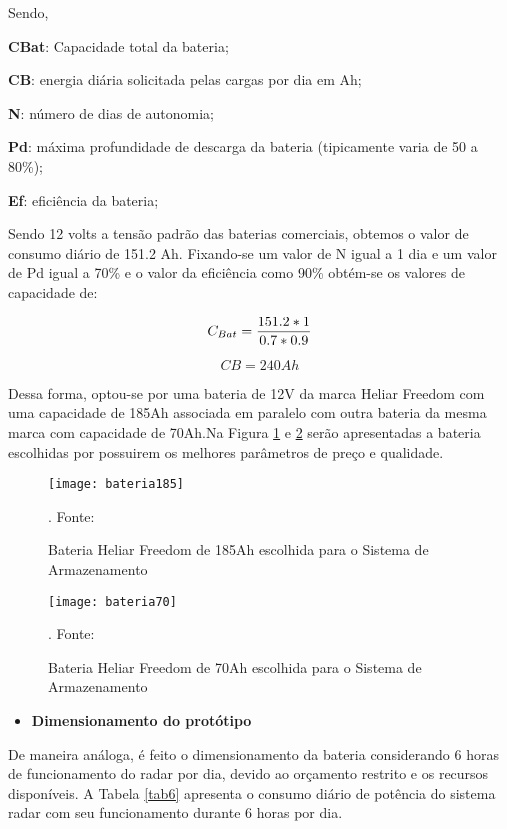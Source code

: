 Sendo,

\textbf{CBat}: Capacidade total da bateria;

\textbf{CB}: energia diária solicitada pelas cargas por dia em Ah;

\textbf{N}: número de dias de autonomia;

\textbf{Pd}: máxima profundidade de descarga da bateria (tipicamente varia de 50 a 80\%);

\textbf{Ef}: eficiência da bateria;

Sendo 12 volts a tensão padrão das baterias comerciais, obtemos o valor de consumo diário de 151.2 Ah. Fixando-se um valor de N igual a 1 dia e um valor de Pd igual a 70\% e o valor da eficiência como 90\% obtém-se os valores de capacidade de:

\begin{equation}
    C_{Bat} = \frac{151.2*1}{0.7*0.9}\\
\end{equation}

\begin{equation}
    CB = 240 Ah
\end{equation}



Dessa forma, optou-se por uma bateria de 12V da marca Heliar Freedom com uma capacidade de 185Ah associada em paralelo com outra bateria da mesma marca com capacidade de 70Ah.Na Figura \ref{fig:bateria185} e \ref{fig:bateria70} serão apresentadas a bateria escolhidas por possuirem os melhores parâmetros de preço e qualidade.

\begin{figure}[h!]
\centering
\texttt{[image: bateria185]}
\caption{Bateria Heliar Freedom de 185Ah escolhida para o Sistema de Armazenamento}. Fonte: %
\label{fig:bateria185}
\end{figure}
\pagebreak

\begin{figure}[h!]
\centering
\texttt{[image: bateria70]}
\caption{Bateria Heliar Freedom de 70Ah escolhida para o Sistema de Armazenamento}. Fonte: %
\label{fig:bateria70}
\end{figure}

    \begin{itemize}
        \item \textbf{Dimensionamento do protótipo}
    \end{itemize}
    
    De maneira análoga, é feito o dimensionamento da bateria considerando 6 horas de funcionamento do radar por dia, devido ao orçamento restrito e os recursos disponíveis. A Tabela \ref{tab6} apresenta o consumo diário de potência do sistema radar com seu funcionamento durante 6 horas por dia.
    
